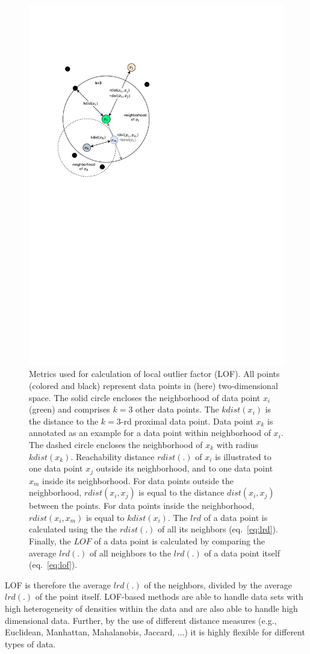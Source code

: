 \documentclass[conference]{IEEEtran}
\begin{document}
\begin{figure}[t]
\centering
\includegraphics[page=1,width=.45\textwidth, trim=60 440 310 120, clip]{images/lof.pdf} 
\caption{Metrics used for calculation of local outlier factor (LOF). All points (colored and black) represent data points in (here) two-dimensional space. The solid circle encloses the neighborhood of data point $x_i$ (green) and comprises $k=3$ other data points. The $kdist(x_i)$ is the distance to the $k=3$-rd proximal data point. Data point $x_k$ is annotated as an example for a data point within neighborhood of $x_i$. The dashed circle encloses the neighborhood of $x_k$ with radius $kdist(x_k)$. Reachability distance $rdist(.)$ of $x_i$ is illustrated to one data point $x_j$ outside its neighborhood, and to one data point $x_m$ inside its neighborhood. For data points outside the neighborhood, $rdist(x_i,x_j)$ is equal to the distance $dist(x_i,x_j)$ between the points. For data points inside the neighborhood, $rdist(x_i,x_m)$ is equal to $kdist(x_i)$. The $lrd$ of a data point is calculated using the the $rdist(.)$ of all its neighbors (eq.~\ref{eq:lrd}). Finally, the $LOF$ of a data point is calculated by comparing the average $lrd(.)$ of all neighbors to the $lrd(.)$ of a data point itself (eq.~\ref{eq:lof}).}
\label{fig:lof}
\end{figure}

LOF is therefore the average $lrd(.)$ of the neighbors, divided by the average $lrd(.)$ of the point itself. LOF-based methods are able to handle data sets with high heterogeneity of densities within the data and are also able to handle high dimensional data. Further, by the use of different distance measures (e.g., Euclidean, Manhattan, Mahalanobis, Jaccard, ...) \cite{cha2007comprehensive} it is highly flexible for different types of data.
\end{document}
